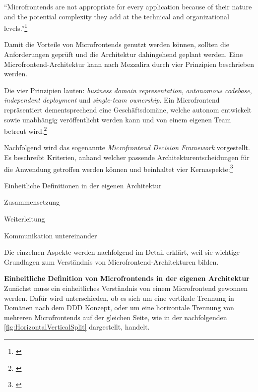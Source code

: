 \enquote{Microfrontends are not appropriate for every application because of their nature and the potential complexity they add at the technical and organizational levels.}\footnote{\cite[][20]{Mezzalira2021}}

Damit die Vorteile von Microfrontends genutzt werden können, sollten die Anforderungen geprüft und die Architektur dahingehend geplant werden. Eine Microfrontend-Architektur kann nach Mezzalira durch vier Prinzipien beschrieben werden. 

Die vier Prinzipien lauten: \textit{business domain representation}, \textit{autonomous codebase}, \textit{independent deployment} und \textit{single-team ownership}. Ein Microfrontend repräsentiert dementsprechend eine Geschäftsdomäne, welche autonom entwickelt sowie unabhängig veröffentlicht werden kann und von einem eigenen Team betreut wird.\footnote{\cite[vgl.][23]{Mezzalira2021}}

Nachfolgend wird das sogenannte \textit{Microfrontend Decision Framework} vorgestellt. Es beschreibt Kriterien, anhand welcher passende Architekturentscheidungen für die Anwendung getroffen werden können und beinhaltet vier Kernaspekte:\footnote{\cite[vgl.][24]{Mezzalira2021}}

\begin{compactitem}
	\item Einheitliche Definitionen in der eigenen Architektur
	\item Zusammensetzung
	\item Weiterleitung
	\item Kommunikation untereinander
\end{compactitem}

Die einzelnen Aspekte werden nachfolgend im Detail erklärt, weil sie wichtige Grundlagen zum Verständnis von Microfrontend-Architekturen bilden.

\textbf{Einheitliche Definition von Microfrontends in der eigenen Architektur}\\
Zunächst muss ein einheitliches Verständnis von einem Microfrontend gewonnen werden. Dafür wird unterschieden, ob es sich um eine vertikale Trennung in Domänen nach dem \gls{DDD} Konzept, oder um eine horizontale Trennung von mehreren Microfrontends auf der gleichen Seite, wie in der nachfolgenden \cref{fig:HorizontalVerticalSplit} dargestellt, handelt.

